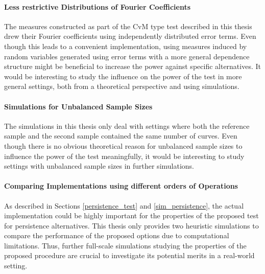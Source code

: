\documentclass[12pt, a4paper]{article}
\theoremstyle{MAstyle} \newtheorem{assumption}{Assumption}[section]
\theoremstyle{MAstyle} \newtheorem{definition}{Definition}[section]
\theoremstyle{MAstyle} \newtheorem{theorem}{Theorem}[section]
\begin{document}
			\paragraph{Less restrictive Distributions of Fourier Coefficients\\}
			The measures constructed as part of the CvM type test described in this thesis drew their Fourier coefficients using independently distributed error terms. Even though this leads to a convenient implementation, using measures induced by random variables generated using error terms with a more general dependence structure might be beneficial to increase the power against specific alternatives. It would be interesting to study the influence on the power of the test in more general settings, both from a theoretical perspective and using simulations. 
		
			\paragraph{Simulations for Unbalanced Sample Sizes\\}
			The simulations in this thesis only deal with settings where both the reference sample and the second sample contained the same number of curves. Even though there is no obvious theoretical reason for unbalanced sample sizes to influence the power of the test meaningfully, it would be interesting to study settings with unbalanced sample sizes in further simulations.		
			
			\paragraph{Comparing Implementations using different orders of Operations\\}
			As described in Sections \ref{persistence_test} and \ref{sim_persistence}, the actual implementation could be highly important for the properties of the proposed test for persistence alternatives. This thesis only provides two heuristic simulations to compare the performance of the proposed options due to computational limitations. Thus, further full-scale simulations studying the properties of the proposed procedure are crucial to investigate its potential merits in a real-world setting.
		
\end{document}
